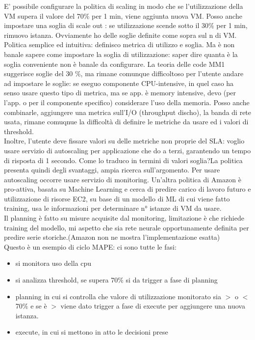 \documentclass{article}
\begin{document}
E' possibile configurare la politica di scaling in modo che se l'utilizzazione della VM supera il valore del 70$\%$ per 1 min, viene aggiunta nuova VM. Posso anche impostare una soglia di scale out : se utilizzazione scende sotto il 30$\%$ per 1 min, rimuovo istanza. Ovviamente ho delle soglie definite come sopra sul n di VM.
Politica semplice ed intuitiva: definisco metrica di utilizzo e soglia. Ma è non banale sapere come impostare la soglia di utilizzazione: saper dire quanta è la soglia conveniente non è banale da configurare. La teoria delle code MM1 suggerisce soglie del 30 $\%$, ma rimane comunque difficoltoso per l'utente andare ad impostare le soglie: se eseguo componente CPU-intensive, in quel caso ha senso usare questo tipo di metrica, ma se app. è memory intensive, devo (per l'app. o per il componente specifico) considerare l'uso della memoria. Posso anche combinarle, aggiungere una metrica sull'I/O (throughput discho), la banda di rete usata, rimane comuqnue la difficoltà di definire le metriche da usare ed i valori di threshold.\\
Inoltre, l'utente deve fissare valori su delle metriche non proprie del SLA: voglio usare servizio di autoscaling per applicazione che do a terzi, garantendo un tempo di risposta di 1 secondo. Come lo traduco in termini di valori soglia?La politica presenta quindi degli svantaggi, ampia ricerca sull'argomento.
Per usare autoscaling occorre usare servizio di monitoring.
Un'altra politica di Amazon è pro-attiva, basata su Machine Learning e cerca di predire carico di lavoro futuro e utilizzazione di risorse EC2, su base di un modello di ML di cui viene fatto training, usa le informazioni per determinare n° istanze di VM da usare.\\
Il planning è fatto su misure acquisite dal monitoring, limitazione è che richiede training del modello, mi aspetto che sia rete neurale opportunamente definita per predire serie storiche.(Amazon non ne mostra l'implementazione esatta)\\
Questo è un esempio di ciclo MAPE: ci sono tutte le fasi:
\begin{itemize}
\item si monitora uso della cpu
\item si analizza threshold, se supera 70$\%$ si da trigger a fase di planning
\item planning in cui si controlla che valore di utilizzazione monitorato sia $>$ o $<$ 70$\%$ e se è $>$ viene dato trigger a fase di execute per aggiungere una nuova istanza.
\item execute, in cui si mettono in atto le decisioni prese
\end{itemize}
\end{document}
